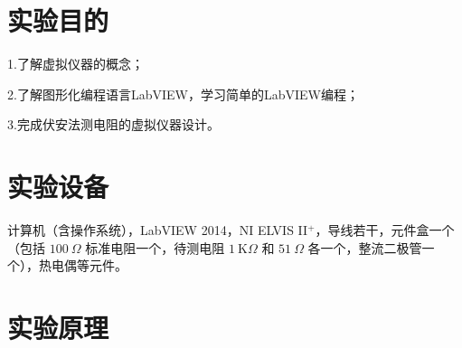 \documentclass[UTF8]{article}
\def\kO{\ \mathrm{K}\Omega}
\theoremstyle{MyLineTheoremStyle} %
\theoremstyle{MyBlockTheoremStyle} %
\theoremstyle{MySubsubsectionStyle} %
\begin{document}
\newpage
{}





\section{实验目的}
1.了解虚拟仪器的概念；

2.了解图形化编程语言LabVIEW，学习简单的LabVIEW编程；

3.完成伏安法测电阻的虚拟仪器设计。

\section{实验设备}
计算机（含操作系统），LabVIEW 2014，NI ELVIS II$ ^+ $，导线若干，元件盒一个（包括 $ 100 \ \Omega$ 标准电阻一个，待测电阻 $ 1 \kO $ 和 $ 51 \ \Omega$ 各一个，整流二极管一个），热电偶等元件。
\section{实验原理}
\end{document}
